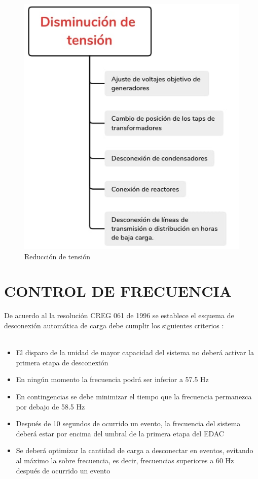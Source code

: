 \documentclass[a5paper]{book}%
\begin{document}
\begin{figure}[H]
  \centering
  \caption{Reducción de  tensión}
  \label{fig:reducciontension}
  \includegraphics[width=0.8\linewidth]{reducirtension}
\end{figure}

  


\chapter{CONTROL DE FRECUENCIA}

De acuerdo al la resolución CREG 061 de 1996 se establece el esquema de desconexión automática de carga debe cumplir los siguientes criterios \cite{CREG0611996}:\\\\

\begin{itemize}
\item El disparo de la unidad de mayor capacidad del sistema no deberá activar la primera etapa de
desconexión
\item En ningún momento la frecuencia podrá ser inferior a 57.5 Hz
\item En contingencias se debe minimizar el tiempo que la frecuencia permanezca por debajo de 58.5 Hz
\item Después de 10 segundos de ocurrido un evento, la frecuencia del sistema deberá estar por encima
del umbral de la primera etapa del EDAC
\item Se deberá optimizar la cantidad de carga a desconectar en eventos, evitando al máximo la sobre
frecuencia, es decir, frecuencias superiores a 60 Hz después de ocurrido un evento
\end{itemize}
\end{document}
